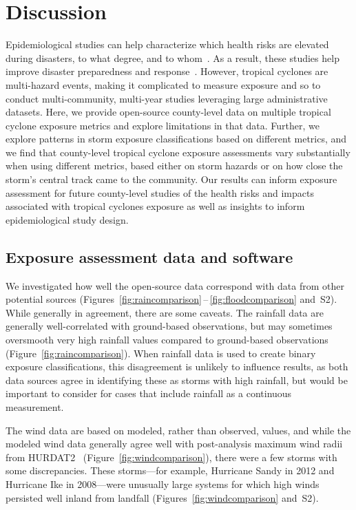 \section*{Discussion}

Epidemiological studies can help characterize which health risks are elevated
during disasters, to what degree, and to
whom~\parencite{ibrahim2005unfortunate, noji2005disasters}.  As a result, these
studies help improve disaster preparedness and
response~\parencite{noji2005disasters}.  However, tropical cyclones are
multi-hazard events, making it complicated to measure exposure and so to
conduct multi-community, multi-year studies leveraging large administrative
datasets.  Here, we provide open-source county-level data on multiple tropical
cyclone exposure metrics and explore limitations in that data.  
Further, we explore patterns in storm exposure classifications based on
different metrics, and we find that county-level tropical cyclone exposure
assessments vary substantially when using different metrics, based either on
storm hazards or on how close the storm's central track came to the community.
Our results can inform exposure assessment for future county-level studies of
the health risks and impacts associated with tropical cyclones exposure as
well as insights to inform epidemiological study design.  

\subsection*{Exposure assessment data and software}

We investigated how well the open-source data correspond with data from other
potential sources
(Figures~\ref{fig:raincomparison}\,--\,\ref{fig:floodcomparison} and~S2). While
generally in agreement, there are some caveats. The rainfall data are generally
well-correlated with ground-based observations, but may sometimes oversmooth
very high rainfall values compared to ground-based observations
(Figure~\ref{fig:raincomparison}). When rainfall data is used to create binary
exposure classifications, this disagreement is unlikely to influence results,
as both data sources agree in identifying these as storms with high rainfall,
but would be important to consider for cases that include rainfall as a
continuous measurement. 

The wind data are based on modeled, rather than observed, values, and while the
modeled wind data generally agree well with post-analysis maximum wind radii
from \ac{HURDAT2}~\parencite{landsea2013} (Figure~\ref{fig:windcomparison}),
there were a few storms with some discrepancies. These storms---for example, Hurricane Sandy
in 2012 and Hurricane Ike in 2008---were
unusually large systems for which high winds persisted well inland from
landfall (Figures~\ref{fig:windcomparison}
and~S2). 

